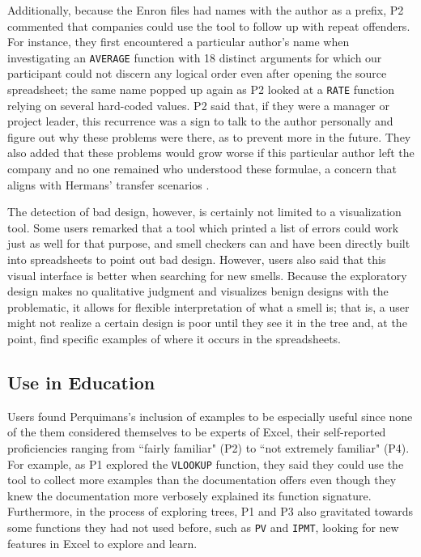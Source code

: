 \documentclass[conference]{IEEEtran}
\newcommand{\toolname}{Perquimans\xspace} \newcommand{\toolnameend}{Perquimans}
\begin{document}
	Additionally, because the Enron files had names with the author as a prefix, P2
	commented that companies could use the tool to follow up with repeat offenders.
	For instance, they first encountered a particular author's name when
	investigating an \texttt{AVERAGE} function with 18 distinct arguments for which our
	participant could not discern any logical order even after opening the source
	spreadsheet; the same name popped up again as P2 looked at a \texttt{RATE} function
	relying on several hard-coded values. P2 said that, if they were a manager or
	project leader, this recurrence was a sign to talk to the author personally and
	figure out why these problems were there, as to prevent more in the future.
	They also added that these problems would grow worse if this particular author
	left the company and no one remained who understood these formulae, a concern
	that aligns with Hermans' transfer scenarios \cite{hermans2011supporting}.
	
	The detection of bad design, however, is certainly not limited to a
	visualization tool. Some users remarked that a tool which printed a list of
	errors could work just as well for that purpose, and smell checkers can and
	have been directly built into spreadsheets to point out bad design. However,
	users also said that this visual interface is better when searching for new
	smells. Because the exploratory design makes no qualitative judgment and
	visualizes benign designs with the problematic, it allows for flexible
	interpretation of what a smell is; that is, a user might not realize a certain
	design is poor until they see it in the tree and, at the point, find specific
	examples of where it occurs in the spreadsheets.
	
	\subsection{Use in Education} Users found \toolname's inclusion of examples to
	be especially useful since none of the them considered themselves to be experts
	of Excel, their self-reported proficiencies ranging from ``fairly familiar"
	(P2) to ``not extremely familiar" (P4). For example, as P1 explored the \texttt{VLOOKUP}
	function, they said they could use the tool to collect more examples than the
	documentation offers even though they knew the documentation more verbosely
	explained its function signature. Furthermore, in the process of exploring
	trees, P1 and P3 also gravitated towards some functions they had not used
	before, such as \texttt{PV} and \texttt{IPMT}, looking for new features in Excel to explore and
	learn. 
	
\end{document}
